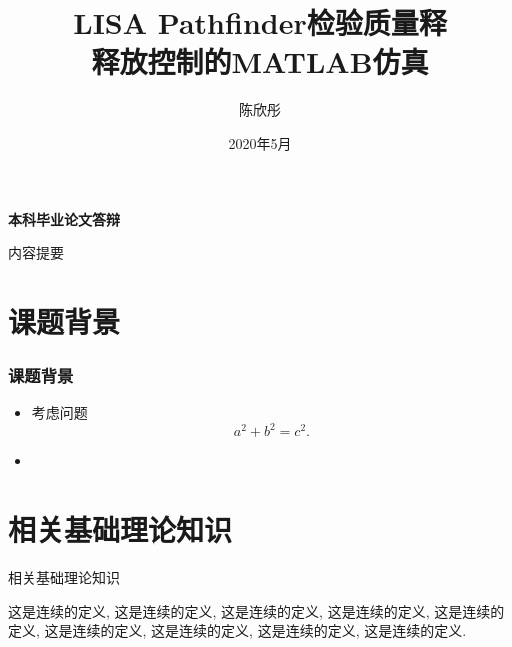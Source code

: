 \documentclass[10pt,compress,t,fontset=none]{ctexbeamer}
\begin{document}
\title[LISA Pathfinder检验质量释放控制仿真]{LISA Pathfinder检验质量释\\ 释放控制的MATLAB仿真}

\author[陈欣彤]{陈欣彤}


\date[2020.5]{2020年5月}


\begin{frame}
\begin{center}
\Huge\bfseries 本科毕业论文答辩
\end{center}
\end{frame}




\begin{frame}[plain]
  \titlepage
\end{frame}

\begin{frame}{内容提要}
  \tableofcontents[hideallsubsections]
\end{frame}

\section{课题背景}


\begin{frame}
  \frametitle{课题背景}
\begin{itemize}
\item 考虑问题
    $$ a^2+b^2=c^2.$$

\bigskip
\item
{}


\end{itemize}

\end{frame}

\section{相关基础理论知识}
\begin{frame}{相关基础理论知识}

  \begin{definition}
    这是连续的定义, 这是连续的定义, 这是连续的定义,
    这是连续的定义, 这是连续的定义, 这是连续的定义,
    这是连续的定义, 这是连续的定义, 这是连续的定义.
  \end{definition}
\end{frame}
\end{document}
